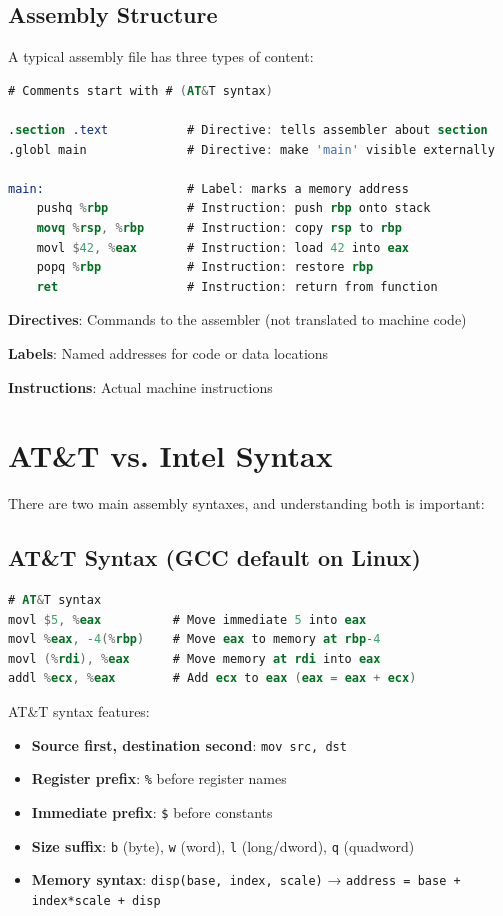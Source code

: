 \subsection{Assembly Structure}

A typical assembly file has three types of content:

\begin{lstlisting}[language=nasm]
# Comments start with # (AT&T syntax)

.section .text           # Directive: tells assembler about section
.globl main              # Directive: make 'main' visible externally

main:                    # Label: marks a memory address
    pushq %rbp           # Instruction: push rbp onto stack
    movq %rsp, %rbp      # Instruction: copy rsp to rbp
    movl $42, %eax       # Instruction: load 42 into eax
    popq %rbp            # Instruction: restore rbp
    ret                  # Instruction: return from function
\end{lstlisting}

\textbf{Directives}: Commands to the assembler (not translated to machine code)

\textbf{Labels}: Named addresses for code or data locations

\textbf{Instructions}: Actual machine instructions

\section{AT\&T vs. Intel Syntax}

There are two main assembly syntaxes, and understanding both is important:

\subsection{AT\&T Syntax (GCC default on Linux)}

\begin{lstlisting}[language=nasm]
# AT&T syntax
movl $5, %eax          # Move immediate 5 into eax
movl %eax, -4(%rbp)    # Move eax to memory at rbp-4
movl (%rdi), %eax      # Move memory at rdi into eax
addl %ecx, %eax        # Add ecx to eax (eax = eax + ecx)
\end{lstlisting}

AT\&T syntax features:
\begin{itemize}
    \item \textbf{Source first, destination second}: \texttt{mov src, dst}
    \item \textbf{Register prefix}: \texttt{\%} before register names
    \item \textbf{Immediate prefix}: \texttt{\$} before constants
    \item \textbf{Size suffix}: \texttt{b} (byte), \texttt{w} (word), \texttt{l} (long/dword), \texttt{q} (quadword)
    \item \textbf{Memory syntax}: \texttt{disp(base, index, scale)} → \texttt{address = base + index*scale + disp}
\end{itemize}

